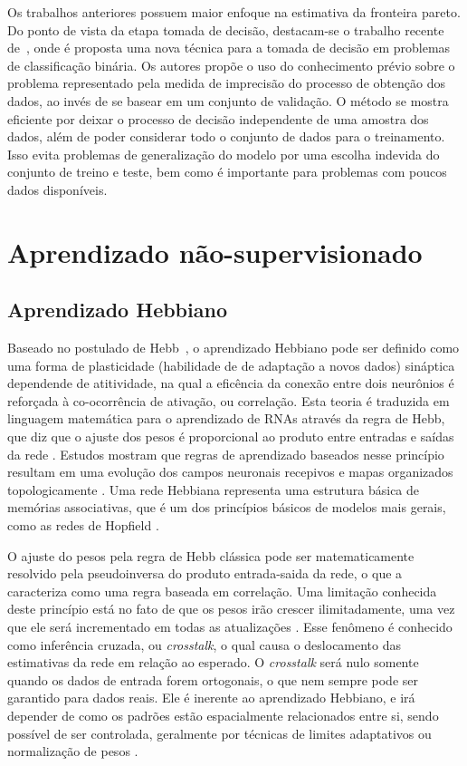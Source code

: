 \documentclass[conference]{IEEEtran}
\begin{document}
	Os trabalhos anteriores possuem maior enfoque na estimativa da fronteira pareto. Do ponto de vista da etapa tomada de decisão, destacam-se o trabalho recente de~\cite{de2017multi}, onde é proposta uma nova técnica para a tomada de decisão em problemas de classificação binária. Os autores propõe o uso do conhecimento prévio sobre o problema representado pela medida de imprecisão do processo de obtenção dos dados, ao invés de se basear em um conjunto de validação. O método se mostra eficiente por deixar o processo de decisão independente de uma amostra dos dados, além de poder considerar todo o conjunto de dados para o treinamento. Isso evita problemas de generalização do modelo por uma escolha indevida do conjunto de treino e teste, bem como é importante para problemas com poucos dados disponíveis.
	
	\section{Aprendizado não-supervisionado}
	
	\subsection{Aprendizado Hebbiano}
	
	Baseado no postulado de Hebb~\cite{hebb1949organization}, o aprendizado Hebbiano pode ser definido como uma forma de plasticidade (habilidade de de adaptação a novos dados) sináptica dependende de atitividade, na qual a eficência da conexão entre dois neurônios é reforçada à co-ocorrência de ativação, ou correlação. Esta teoria é traduzida em linguagem matemática para o aprendizado de RNAs através da regra de Hebb, que diz que o ajuste dos pesos é proporcional ao produto entre entradas e saídas da rede \cite{gerstner2002mathematical}. Estudos mostram que regras de aprendizado baseados nesse princípio resultam em uma evolução dos campos neuronais recepivos e mapas organizados topologicamente \cite{kempter1999hebbian}. Uma rede Hebbiana representa uma estrutura básica de memórias associativas, que é um dos princípios básicos de modelos mais gerais, como as redes de Hopfield \cite{hopfield1982neural}.
		
	O ajuste do pesos pela regra de Hebb clássica pode ser matematicamente resolvido pela pseudoinversa do produto entrada-saida da rede, o que a caracteriza como uma regra baseada em correlação. Uma limitação conhecida deste princípio está no fato de que os pesos irão crescer ilimitadamente, uma vez que ele será incrementado em todas as atualizações \cite{choe2013hebbian}. Esse fenômeno é conhecido como inferência cruzada, ou \textit{crosstalk}, o qual causa o deslocamento das estimativas da rede em relação ao esperado. O \textit{crosstalk} será nulo somente quando os dados de entrada forem ortogonais, o que nem sempre pode ser garantido para dados reais. Ele é inerente ao aprendizado Hebbiano, e irá depender de como os padrões estão espacialmente relacionados entre si, sendo possível de ser controlada, geralmente por técnicas de limites adaptativos \cite{bienenstock1982theory} ou normalização de pesos \cite{miller1994role}.
	
\end{document}
